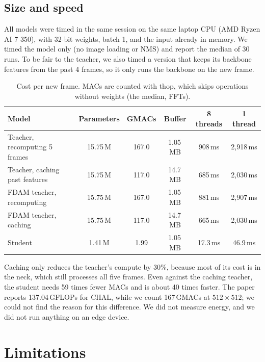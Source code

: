 \documentclass[11pt,a4paper]{article}
\begin{document}
\subsection{Size and speed}

All models were timed in the same session on the same laptop CPU (AMD Ryzen AI 7 350), with 32-bit weights, batch
1, and the input already in memory. We timed the model only (no image loading or NMS) and report the median of 30
runs. To be fair to the teacher, we also timed a version that keeps its backbone features from the past 4 frames,
so it only runs the backbone on the new frame.

\begin{table}[htbp]
\centering
\caption{Cost per new frame. MACs are counted with thop, which skips operations without weights (the median, FFTs).}
\label{tab:speed}
\small
\begin{tabular}{lccccc}
\toprule
Model & Parameters & GMACs & Buffer & 8 threads & 1 thread \\
\midrule
Teacher, recomputing 5 frames & 15.75\,M & 167.0 & 1.05\,MB & 908\,ms & 2{,}918\,ms \\
Teacher, caching past features & 15.75\,M & 117.0 & 14.7\,MB & 685\,ms & 2{,}030\,ms \\
FDAM teacher, recomputing & 15.75\,M & 167.0 & 1.05\,MB & 881\,ms & 2{,}907\,ms \\
FDAM teacher, caching & 15.75\,M & 117.0 & 14.7\,MB & 665\,ms & 2{,}030\,ms \\
Student & 1.41\,M & 1.99 & 1.05\,MB & 17.3\,ms & 46.9\,ms \\
\bottomrule
\end{tabular}
\end{table}

Caching only reduces the teacher's compute by 30\%, because most of its cost is in the neck, which still processes
all five frames. Even against the caching teacher, the student needs 59 times fewer MACs and is about 40 times
faster. The paper reports 137.04\,GFLOPs for CHAL, while we count 167\,GMACs at $512\times512$; we could not find
the reason for this difference. We did not measure energy, and we did not run anything on an edge device.

\section{Limitations}
\end{document}
